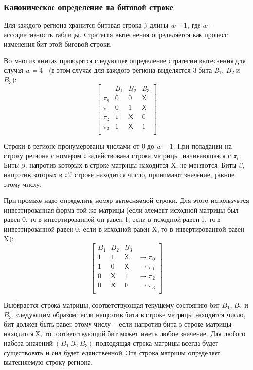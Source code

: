 \begin{enumerate}
\subsubsection{Каноническое определение \PseudoLRU на битовой строке}

Для каждого региона хранится битовая строка $\beta$ длины $w{-}1$, где $w$ --
ассоциативность таблицы. Стратегия вытеснения определяется как процесс изменения
бит этой битовой строки.

Во многих книгах приводятся следующее определение стратегии
вытеснения \PseudoLRU для случая
$w=4$~\cite{FundamentalOfComputerOrganizationAndDesign} (в этом
случае для каждого региона выделяется 3 бита $B_1$, $B_2$ и $B_3$):
$$ \left[
  \begin{array}{c|ccc}
          & B_1 & B_2 & B_3 \\ \hline
    \pi_0 & 0 & 0 & \textsf{X} \\
    \pi_1 & 0 & 1 & \textsf{X} \\
    \pi_2 & 1 & \textsf{X} & 0 \\
    \pi_3 & 1 & \textsf{X} & 1 \\
  \end{array}
\right]
$$

Строки в регионе пронумерованы числами от 0 до $w{-}1$. При попадании на строку
региона с номером $i$ задействована строка матрицы, начинающаяся с $\pi_i$. Биты
$\beta$, напротив которых в строке матрицы находится \textsf{X}, не меняются.
Биты $\beta$, напротив которых в $i$'й строке находится число, принимают
значение, равное этому числу.

При промахе надо определить номер вытесняемой строки. Для этого используется
инвертированная форма той же матрицы (если элемент исходной матрицы был равен 0, то в инвертированной он равен 1; если в исходной равен 1, то в инвертированной равен 0; если в исходной равен \textsf{X}, то в инвертированной равен \textsf{X}):
$$
\left[
  \begin{array}{ccc|c}
    B_1 & B_2 & B_3 & \\ \hline
    1 & 1 & \textsf{X} & \rightarrow \pi_0 \\
    1 & 0 & \textsf{X} & \rightarrow \pi_1 \\
    0 & \textsf{X} & 1 & \rightarrow \pi_2 \\
    0 & \textsf{X} & 0 & \rightarrow \pi_3 \\
  \end{array}
\right]
$$

Выбирается строка матрицы, соответствующая текущему состоянию бит $B_1$,
$B_2$ и $B_3$, следующим образом: если напротив бита в строке матрицы находится число, бит
должен быть равен этому числу -- если напротив бита в строке матрицы
находится \textsf{X}, то соответствующий бит может иметь любое значение. Для любого набора значений $(B_1~B_2~B_3)$ подходящая строка матрицы всегда будет существовать и она будет единственной. Эта строка матрицы определяет вытесняемую строку региона.


\end{enumerate}
